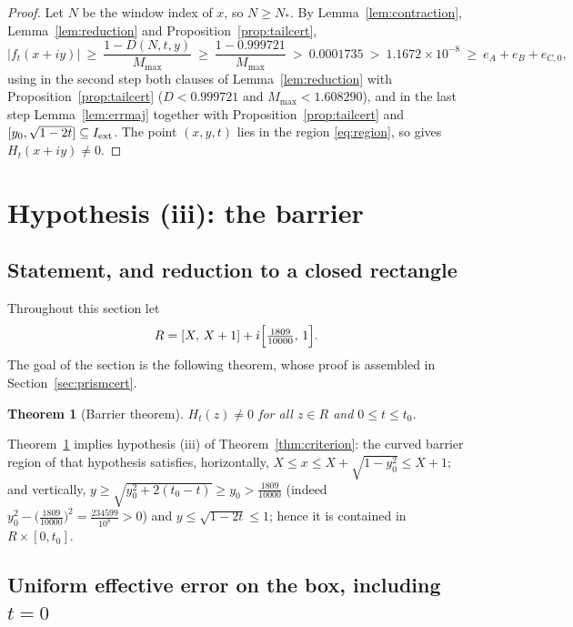 \documentclass[11pt]{article}
\newtheorem{theorem}{Theorem}[section]
\theoremstyle{definition}
\begin{document}
\begin{proof}
Let $N$ be the window index of $x$, so $N\ge N_*$. By
Lemma~\ref{lem:contraction}, Lemma~\ref{lem:reduction} and
Proposition~\ref{prop:tailcert},
\[
|f_t(x+iy)|\ \ge\ \frac{1-D(N,t,y)}{M_{\max}}
\ \ge\ \frac{1-0.999721}{M_{\max}}
\ >\ 0.0001735
\ >\ 1.1672\times10^{-8}
\ \ge\ e_A+e_B+e_{C,0},
\]
using in the second step both clauses of
Lemma~\ref{lem:reduction} with Proposition~\ref{prop:tailcert}
($D<0.999721$ and $M_{\max}<1.608290$), and in the last step
Lemma~\ref{lem:errmaj} together with
Proposition~\ref{prop:tailcert} and
$[y_0,\sqrt{1-2t}]\subseteq I_{\rm ext}$. The point $(x,y,t)$
lies in the region \eqref{eq:region}, so
\cite[Corollary~1.4]{Polymath} gives $H_t(x+iy)\neq0$.
\end{proof}

\section{Hypothesis (iii): the barrier}\label{sec:barrier}

\subsection{Statement, and reduction to a closed rectangle}

Throughout this section let
\[
R=[X,\,X+1]+i\Bigl[\tfrac{1809}{10000},\,1\Bigr].
\]
The goal of the section is the following theorem, whose proof is
assembled in Section~\ref{sec:prismcert}.

\begin{theorem}[Barrier theorem]\label{thm:barrier}
$H_t(z)\ne0$ for all $z\in R$ and $0\le t\le t_0$.
\end{theorem}

Theorem~\ref{thm:barrier} implies hypothesis (iii) of
Theorem~\ref{thm:criterion}: the curved barrier region of that
hypothesis satisfies, horizontally,
$X\le x\le X+\sqrt{1-y_0^2}\le X+1$; and vertically,
$y\ge\sqrt{y_0^2+2(t_0-t)}\ge y_0>\frac{1809}{10000}$ (indeed
$y_0^2-\bigl(\frac{1809}{10000}\bigr)^2=\frac{234599}{10^8}>0$) and
$y\le\sqrt{1-2t}\le1$; hence it is contained in $R\times[0,t_0]$.

\subsection{Uniform effective error on the box, including $t=0$}
\label{sec:barriererr}
\end{document}

